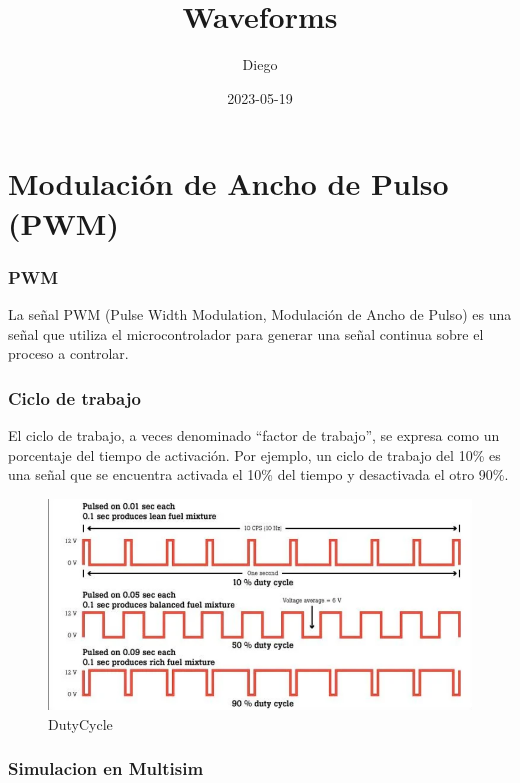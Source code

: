 \documentclass[
]{article}
\title{Waveforms}
\author{Diego}
\date{2023-05-19}
\begin{document}
\maketitle

\hypertarget{modulaciuxf3n-de-ancho-de-pulso-pwm}{%
\section{Modulación de Ancho de Pulso
(PWM)}\label{modulaciuxf3n-de-ancho-de-pulso-pwm}}

\hypertarget{pwm}{%
\subsubsection{PWM}\label{pwm}}

La señal PWM (Pulse Width Modulation, Modulación de Ancho de Pulso) es
una señal que utiliza el microcontrolador para generar una señal
continua sobre el proceso a controlar.

\hypertarget{ciclo-de-trabajo}{%
\subsubsection{Ciclo de trabajo}\label{ciclo-de-trabajo}}

El ciclo de trabajo, a veces denominado ``factor de trabajo'', se
expresa como un porcentaje del tiempo de activación. Por ejemplo, un
ciclo de trabajo del 10\% es una señal que se encuentra activada el 10\%
del tiempo y desactivada el otro 90\%.

\begin{figure}
\centering
\includegraphics{images/Duty.png}
\caption{DutyCycle}
\end{figure}

\hypertarget{simulacion-en-multisim}{%
\subsubsection{Simulacion en Multisim}\label{simulacion-en-multisim}}
\end{document}
